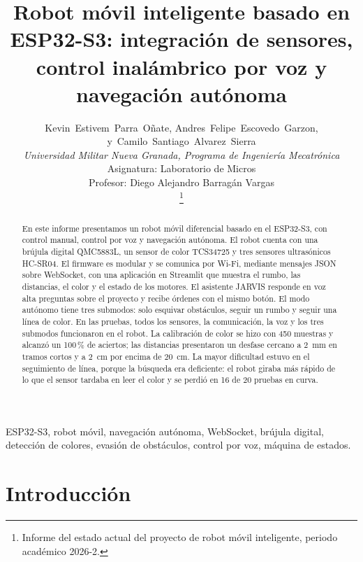 \documentclass[journal]{IEEEtran}
\begin{document}
\title{Robot móvil inteligente basado en ESP32-S3: integración de sensores, control inalámbrico por voz y navegación autónoma}

\author{
Kevin~Estivem~Parra~Oñate,
Andres~Felipe~Escovedo~Garzon,
y~Camilo~Santiago~Alvarez~Sierra\\
\textit{Universidad Militar Nueva Granada, Programa de Ingeniería Mecatrónica}\\
Asignatura: Laboratorio de Micros\\
Profesor: Diego Alejandro Barragán Vargas\\
\thanks{Informe del estado actual del proyecto de robot móvil inteligente, periodo académico 2026-2.}
}

\maketitle

\begin{abstract}
En este informe presentamos un robot móvil diferencial basado en el ESP32-S3, con control manual, control por voz y navegación autónoma. El robot cuenta con una brújula digital QMC5883L, un sensor de color TCS34725 y tres sensores ultrasónicos HC-SR04. El firmware es modular y se comunica por Wi-Fi, mediante mensajes JSON sobre WebSocket, con una aplicación en Streamlit que muestra el rumbo, las distancias, el color y el estado de los motores. El asistente JARVIS responde en voz alta preguntas sobre el proyecto y recibe órdenes con el mismo botón. El modo autónomo tiene tres submodos: solo esquivar obstáculos, seguir un rumbo y seguir una línea de color. En las pruebas, todos los sensores, la comunicación, la voz y los tres submodos funcionaron en el robot. La calibración de color se hizo con 450 muestras y alcanzó un 100\,\% de aciertos; las distancias presentaron un desfase cercano a 2~mm en tramos cortos y a 2~cm por encima de 20~cm. La mayor dificultad estuvo en el seguimiento de línea, porque la búsqueda era deficiente: el robot giraba más rápido de lo que el sensor tardaba en leer el color y se perdió en 16 de 20 pruebas en curva.
\end{abstract}

\begin{IEEEkeywords}
ESP32-S3, robot móvil, navegación autónoma, WebSocket, brújula digital, detección de colores, evasión de obstáculos, control por voz, máquina de estados.
\end{IEEEkeywords}

\section{Introducción}
\end{document}
